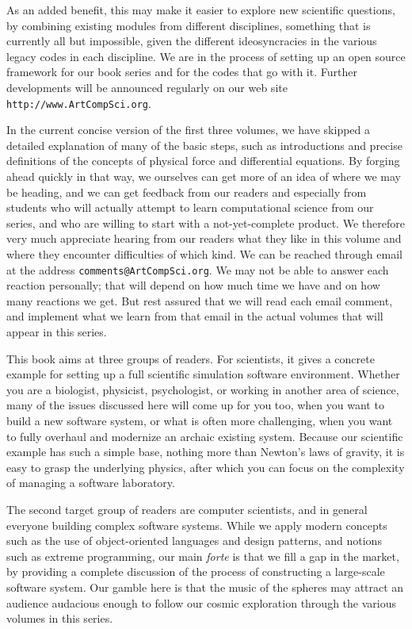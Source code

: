 As an added benefit, this may make it easier to explore new scientific
questions, by combining existing modules from different disciplines,
something that is currently all but impossible, given the different
ideosyncracies in the various legacy codes in each discipline.  We are
in the process of setting up an open source framework for our book
series and for the codes that go with it.  Further developments will
be announced regularly on our web site {\tt http://www.ArtCompSci.org}.

In the current concise version of the first three volumes, we have
skipped a detailed explanation of many of the basic steps, such as
introductions and precise definitions of the concepts of physical
force and differential equations.  By forging ahead quickly in that
way, we ourselves can get more of an idea of where we may be heading,
and we can get feedback from our readers and especially from students
who will actually attempt to learn computational science from our
series, and who are willing to start with a not-yet-complete product.
We therefore very much appreciate hearing from our readers what
they like in this volume and where they encounter difficulties
of which kind.  We can be reached through email at the address
{\tt comments@ArtCompSci.org}.  We may not be able to answer each
reaction personally; that will depend on how much time we have and on
how many reactions we get.  But rest assured that we will read each
email comment, and implement what we learn from that email in the
actual volumes that will appear in this series.

This book aims at three groups of readers.  For scientists, it gives a
concrete example for setting up a full scientific simulation software
environment.  Whether you are a biologist, physicist, psychologist, or
working in another area of science, many of the issues discussed here
will come up for you too, when you want to build a new software system,
or what is often more challenging, when you want to fully overhaul and
modernize an archaic existing system.  Because our scientific example
has such a simple base, nothing more than Newton's laws of gravity, it
is easy to grasp the underlying physics, after which you can focus on
the complexity of managing a software laboratory.

The second target group of readers are computer scientists, and in
general everyone building complex software systems.  While we apply
modern concepts such as the use of object-oriented languages and
design patterns, and notions such as extreme programming, our main
{\it forte} is that we fill a gap in the market, by providing a
complete discussion of the process of constructing a large-scale
software system.  Our gamble here is that the music of the spheres may
attract an audience audacious enough to follow our cosmic exploration
through the various volumes in this series.

